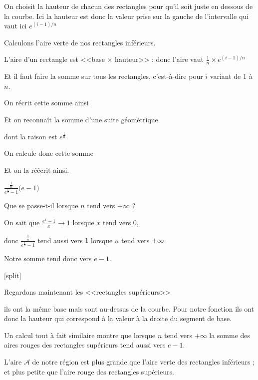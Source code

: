 On choisit la hauteur de chacun des rectangles pour qu'il soit juste en dessous de la courbe.
Ici la hauteur est donc la valeur prise sur la gauche de l'intervalle qui vaut ici $e^{(i-1)/n}$


\change

Calculons l'aire verte de nos rectangles inférieurs.

L'aire d'un rectangle est <<base $\times$ hauteur>> : 
donc l'aire vaut $\frac1n \times e^{(i-1)/n}$

Et il faut faire la somme sur tous les rectangles, c'est-à-dire pour $i$ variant de $1$
à $n$.

\change

On récrit cette somme ainsi

Et on reconnaît la somme d'une suite géométrique

dont la raison est $e^{\frac 1n}$.

\change

On calcule donc cette somme 

\change

Et on la réécrit ainsi.

$\frac{\frac{1}{n}}{e^{\frac 1n}-1}\big(e-1\big) $


Que se passe-t-il lorsque $n$ tend vers $+\infty$ ?

On sait que $\frac{e^x-1}{x} \to 1$ lorsque $x$ tend vers $0$,

donc $\frac{\frac{1}{n}}{e^{\frac 1n}-1}$ tend aussi vers $1$ lorsque $n$ tend vers $+\infty$.

\change

Notre somme tend donc vers $e-1$.

\bigskip

[split]

\change





Regardons maintenant les <<rectangles supérieurs>> 

ils ont la même base mais sont au-dessus de la courbe. Pour notre fonction
ils ont donc la hauteur qui correspond à la valeur à la droite du segment de base.


Un calcul tout à fait similaire montre que lorsque $n$ tend vers $+\infty$ la somme des aires rouges des rectangles supérieurs
tend aussi vers $e-1$.

\change


L'aire $\mathcal{A}$ de notre région est plus grande que l'aire verte des rectangles inférieurs  ;
et plus petite que l'aire rouge des rectangles supérieurs. 


